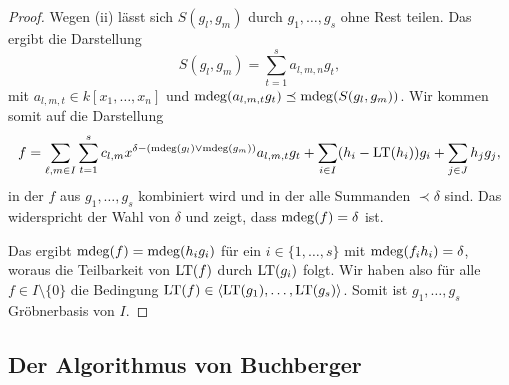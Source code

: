 \documentclass[11pt]{article}
\numberwithin{equation}{section}
\begin{document}
\begin{proof}
	Wegen (ii) lässt sich $S(g_l,g_m)$ durch $g_1,\ldots,g_s$ ohne Rest teilen. Das ergibt die Darstellung 
	\[
			S(g_l, g_m) = \sum_{t=1}^s a_{l,m,n} g_t, 
	\]
	mit $a_{l,m,t} \in k[x_1,\ldots,x_n]$ und $\operatorname{mdeg}(a _{l,m,t} g_t) \preceq \operatorname{mdeg}(S(g_l,g_m))$. Wir kommen somit auf die Darstellung 
	\[
		f = \sum_{\ell, m \in I} \sum_{t=1}^s c_{l,m} x^{\delta - (\operatorname{mdeg}(g_l) \vee \operatorname{mdeg}(g_m))} a_{l,m,t} g_t  + \sum_{i \in I} (h_i - \operatorname{LT}(h_i)) g_i + \sum_{j \in J} h_j g_j, 
	\]
	in der $f$ aus $g_1,\ldots, g_s$ kombiniert wird und 
	in der alle Summanden $\prec \delta$ sind. Das widerspricht der Wahl von $\delta$ und zeigt, dass $\operatorname{mdeg}(f) = \delta$ ist. 
	
	Das ergibt $\operatorname{mdeg}(f) = \operatorname{mdeg}( h_i g_i)$ für ein $i \in \{1,\ldots,s\}$ mit $\operatorname{mdeg}(f_i h_i) = \delta$, woraus die Teilbarkeit von $\operatorname{LT}(f)$ durch $\operatorname{LT}(g_i)$ folgt. Wir haben also für alle $f \in I \setminus \{0\}$ die Bedingung  $\operatorname{LT}(f) \in \left<  \operatorname{LT}(g_1),\ldots, \operatorname{LT}(g_s) \right>$. Somit ist $g_1,\ldots,g_s$ Gröbnerbasis von $I$. 
\end{proof} 

\subsection{Der Algorithmus von Buchberger} 
\end{document}
